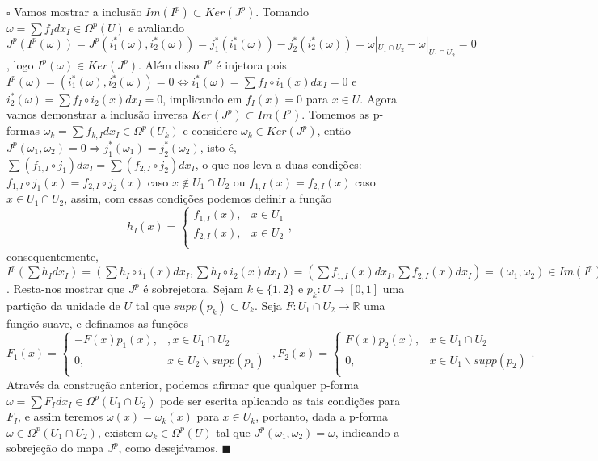 \documentclass{article}
\begin{document}
	$\square$ Vamos mostrar a inclusão $Im(I^{p}) \subset Ker(J^{p})$. Tomando $\omega = \sum f_{I}dx_{I} \in \Omega^{p}(U)$ e avaliando $J^{p}(I^{p}(\omega)) = J^{p}(i^{*}_{1}(\omega), i^{*}_{2}(\omega)) = j^{*}_{1}(i^{*}_{1}(\omega))- j^{*}_{2}(i^{*}_{2}(\omega)) = \omega|_{U_{1} \cap U_{2}} - \omega|_{U_{1} \cap U_{2}} = 0$, logo $I^{p}(\omega) \in Ker(J^{p})$. Além disso $I^{p}$ é injetora pois $I^{p}(\omega) = (i^{*}_{1}(\omega), i^{*}_{2}(\omega)) = 0 \iff i^{*}_{1}(\omega)=\sum f_{I}\circ i_{1}(x) dx_{I} = 0$ e $i^{*}_{2}(\omega) = \sum f_{I}\circ i_{2}(x) dx_{I} = 0$, implicando em $f_{I}(x) = 0$ para $x \in U$.  Agora vamos demonstrar a inclusão inversa $Ker(J^{p})\subset Im(I^{p})$. Tomemos as p-formas $\omega_{k} = \sum f_{k,I} dx_{I} \in \Omega^{p}(U_{k})$ e considere $\omega_{k} \in Ker(J^{p})$, então $J^{p}(\omega_{1}, \omega_{2}) = 0 \Rightarrow j^{*}_{1}(\omega_{1}) = j^{*}_{2}(\omega_{2})$, isto é, $\sum (f_{1,I}\circ j_{1}) dx_{I} = \sum (f_{2,I}\circ j_{2}) dx_{I}$, o que nos leva a duas condições: $f_{1,I}\circ j_{1}(x) = f_{2,I}\circ j_{2}(x)$ caso $x \notin U_{1} \cap U_{2}$ ou $f_{1,I}(x) = f_{2,I}(x)$ caso $x \in U_{1} \cap U_{2}$, assim, com essas condições podemos definir a função 
	$$
	h_{I}(x) = \left\{
	\begin{array}{cc}
	f_{1,I}(x), & x \in U_{1} \\
	f_{2,I}(x), & x \in U_{2} \\
	\end{array},
	\right.
	$$
	consequentemente, $I^{p}(\sum h_{I}dx_{I}) = (\sum h_{I}\circ i_{1}(x)dx_{I}, \sum h_{I}\circ i_{2}(x)dx_{I}) = (\sum f_{1,I}(x)dx_{I}, \sum f_{2,I}(x)dx_{I}) = (\omega_{1}, \omega_{2}) \in Im(I^{p})$. Resta-nos mostrar que $J^{p}$ é sobrejetora. Sejam $k \in \{1,2\}$ e $p_{k}: U \to [0,1]$ uma partição da unidade de $U$ tal que $supp(p_{k}) \subset U_{k}$. Seja $F: U_{1} \cap U_{2} \to \mathbb{R}$ uma função suave, e definamos as funções
	$$
	F_{1}(x) = \left\{
	\begin{array}{cc}
	-F(x)p_{1}(x), &, x \in U_{1} \cap U_{2} \\
	0, & x \in U_{2}\backslash supp(p_{1})\\
	\end{array}
	\right.
	\; ,F_{2}(x) = \left\{
	\begin{array}{cc}
	F(x)p_{2}(x), & x \in U_{1} \cap U_{2} \\
	0, & x \in U_{1}\backslash supp(p_{2}) \\
	\end{array}.
	\right.
	$$ 
	Através da construção anterior, podemos afirmar que qualquer p-forma $\omega = \sum F_{I}dx_{I} \in \Omega^{p}( U_{1} \cap U_{2})$ pode ser escrita aplicando as tais condições para $F_{I}$, e assim teremos $\omega(x) = \omega_{k}(x)$ para $x \in U_{k}$, portanto, dada a p-forma $\omega \in \Omega^{p}( U_{1} \cap U_{2})$, existem $\omega_{k} \in \Omega^{p}(U)$ tal que $J^{p}(\omega_{1}, \omega_{2}) = \omega$, indicando a sobrejeção do mapa $J^{p}$, como desejávamos. $\blacksquare$
\end{document}
